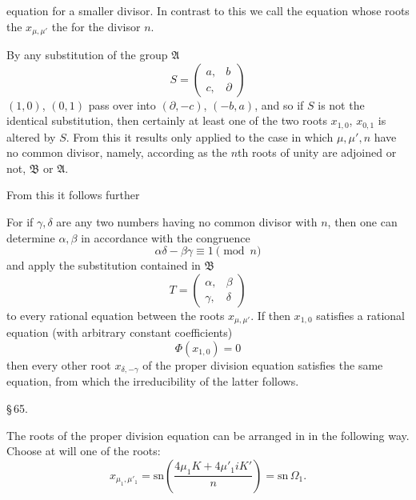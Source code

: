 equation for a smaller divisor. In contrast to this we call the
equation whose roots  the $x_{\mu,\mu'}$ %
the  for the divisor $n$.

By any substitution of the group $\mathfrak{A}$
\[
S = \begin{pmatrix} a, & b\\ c, & \partial \end{pmatrix}
\]
$(1,0)$, $(0,1)$ pass over into $(\partial, -c)$, $(-b, a)$, and so if $S$ is not
the identical substitution, then certainly at least one of the
two roots $x_{1,0}$, $x_{0,1}$ is altered by $S$. From this it results
only applied to the case in which $\mu, \mu', n$ have no common
divisor, namely, according as the $n$th roots of unity
are adjoined or not, $\mathfrak{B}$ or $\mathfrak{A}$.

From this it follows further 

For if $\gamma, \delta$ are any two numbers having no common divisor
with $n$, then one can determine $\alpha, \beta$ in accordance with the congruence
\[
\alpha\delta - \beta\gamma \equiv 1 \pmod{n}
\]
and apply the substitution contained in $\mathfrak{B}$
\[
T = \begin{pmatrix} \alpha, & \beta\\ \gamma, & \delta \end{pmatrix}
\]
to every rational equation between the roots $x_{\mu,\mu'}$.
If then $x_{1,0}$ satisfies a rational equation (with arbitrary constant
coefficients)
\[
\Phi(x_{1,0}) = 0
\]
then every other root $x_{\delta,-\gamma}$ of the proper division equation
satisfies the same equation, from which the irreducibility of the
latter follows.

\begin{center}
\S\,65. \\
\end{center}
The roots of the proper division equation can be arranged
in  in the following way. Choose at will
one of the roots:
\[
x_{\mu_1,\mu'_1} = \mathrm{sn}\left(\frac{4\mu_1 K + 4\mu'_1 iK'}{n}\right) = \mathrm{sn}\,\Omega_1.
\]
